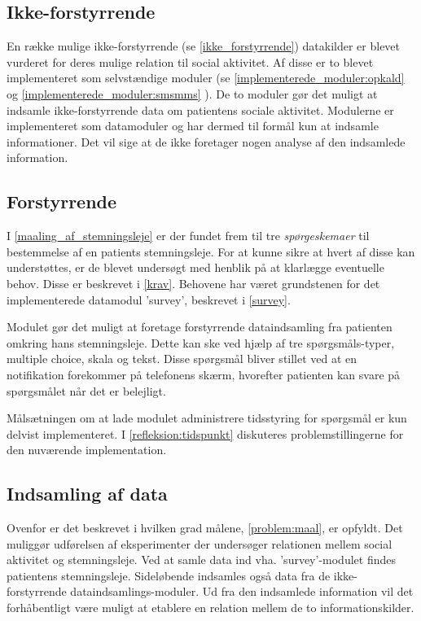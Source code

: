 \subsection{Ikke-forstyrrende}
En række mulige ikke-forstyrrende (se \cref{ikke_forstyrrende}) datakilder er blevet vurderet for deres mulige relation til social aktivitet.
Af disse er to blevet implementeret som selvstændige moduler (se \cref{implementerede_moduler:opkald}  og \cref{implementerede_moduler:smsmms} ).
De to moduler gør det muligt at indsamle ikke-forstyrrende data om patientens sociale aktivitet.
Modulerne er implementeret som datamoduler og har dermed til formål kun at indsamle informationer.
Det vil sige at de ikke foretager nogen analyse af den indsamlede information.

\subsection{Forstyrrende}
I \cref{maaling_af_stemningsleje} er der fundet frem til tre \textit{spørgeskemaer} til bestemmelse af en patients stemningsleje.
For at kunne sikre at hvert af disse kan understøttes, er de blevet undersøgt med henblik på at klarlægge eventuelle behov.
Disse er beskrevet i \cref{krav}.
Behovene har været grundstenen for det implementerede datamodul 'survey', beskrevet i \cref{survey}.

Modulet gør det muligt at foretage forstyrrende dataindsamling fra patienten omkring hans stemningsleje.
Dette kan ske ved hjælp af tre spørgsmåls-typer, multiple choice, skala og tekst.
Disse spørgsmål bliver stillet ved at en notifikation forekommer på telefonens skærm, hvorefter patienten kan svare på spørgsmålet når det er belejligt.

Målsætningen om at lade modulet administrere tidsstyring for spørgsmål er kun delvist implementeret.
I \cref{refleksion:tidspunkt} diskuteres problemstillingerne for den nuværende implementation.
\subsection{Indsamling af data}
Ovenfor er det beskrevet i hvilken grad målene, \cref{problem:maal}, er opfyldt.
Det muliggør udførelsen af eksperimenter der undersøger relationen mellem social aktivitet og stemningsleje.
Ved at samle data ind vha. 'survey'-modulet findes patientens stemningsleje.
Sideløbende indsamles også data fra de ikke-forstyrrende dataindsamlings-moduler.
Ud fra den indsamlede information vil det forhåbentligt være muligt at etablere en relation mellem de to informationskilder.
